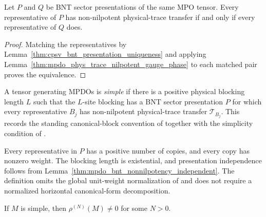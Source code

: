 \begin{lemma}
    \label{thm:mpdo_bnt_nonnilpotency_independent}
    \leanok
    Let $P$ and $Q$ be BNT sector presentations of the same
    MPO tensor. Every representative of $P$ has non-nilpotent
    physical-trace transfer if and only if every representative of $Q$ does.
\end{lemma}

\begin{proof}\leanok
    Matching the representatives by
    Lemma~\ref{thm:cpsv_bnt_presentation_uniqueness} and applying
    Lemma~\ref{thm:mpdo_phys_trace_nilpotent_gauge_phase} to each
    matched pair proves the equivalence.
\end{proof}

\begin{definition}
    \label{def:mpdo_simple_tensor}
    \leanok
    A tensor generating MPDOs is \emph{simple} if there is a positive
    physical blocking length $L$ such that the $L$-site blocking has a BNT sector presentation $P$ for which every
    representative $B_j$ has non-nilpotent physical-trace transfer
    $\mathcal T_{B_j}$. This records the standing canonical-block
    convention of
    \cite[lines~217--246]{Cirac2016MPDO_arXiv} together with the simplicity
    condition of \cite[lines~815--822]{Cirac2016MPDO_arXiv}.

    Every representative in $P$ has a positive number of copies, and every
    copy has nonzero weight. The blocking
    length is existential, and presentation independence follows from
    Lemma~\ref{thm:mpdo_bnt_nonnilpotency_independent}. The definition
    omits the global unit-weight normalization of
    \cite[line~246]{Cirac2016MPDO_arXiv} and does not require a normalized
    horizontal canonical-form decomposition.
\end{definition}

\begin{lemma}
    \label{thm:mpdo_simple_exists_nonzero}
    \leanok
    If $M$ is simple, then $\rho^{(N)}(M)\ne0$ for some $N>0$.
\end{lemma}


